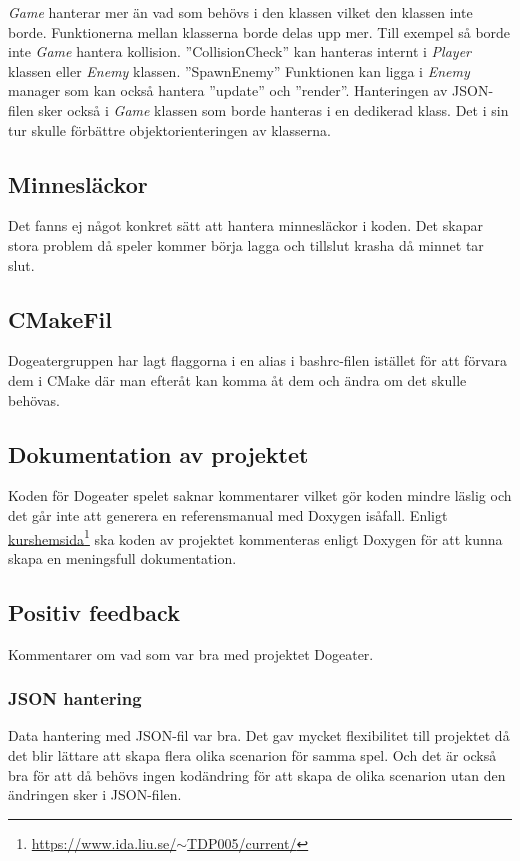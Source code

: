 \documentclass[12pt]{TDP005mall}
\begin{document}
\textit{Game} hanterar mer än vad som behövs i den klassen vilket den klassen inte borde. Funktionerna mellan klasserna borde delas upp mer. Till exempel så borde inte \textit{Game} hantera kollision. ''CollisionCheck'' kan hanteras internt i \textit{Player} klassen eller \textit{Enemy} klassen. 
''SpawnEnemy'' Funktionen kan ligga i \textit{Enemy} manager som kan också hantera ''update'' och ''render''.
Hanteringen av JSON-filen sker också i \textit{Game} klassen som borde hanteras i en dedikerad klass. Det i sin tur skulle förbättre objektorienteringen av klasserna.

\subsection{Minnesläckor}
Det fanns ej något konkret sätt att hantera minnesläckor i koden. Det skapar stora problem då speler kommer börja lagga och tillslut krasha då minnet tar slut.

\subsection{CMakeFil}
Dogeatergruppen har lagt flaggorna i en alias i bashrc-filen istället för att förvara dem i CMake där man efteråt kan komma åt dem och ändra om det skulle behövas. 



\subsection{Dokumentation av projektet}
Koden för Dogeater spelet saknar kommentarer vilket gör koden mindre läslig och det går inte att generera en referensmanual med Doxygen isåfall. 
Enligt \href{https://www.ida.liu.se/~TDP005/current/}{kurshemsida}\footnote{\href{https://www.ida.liu.se/~TDP005/current/}{https://www.ida.liu.se/\(\sim\)TDP005/current/}} ska koden av projektet kommenteras enligt Doxygen för att kunna skapa en meningsfull dokumentation.


\subsection{Positiv feedback}
Kommentarer om vad som var bra med projektet Dogeater.  

\subsubsection{JSON hantering}
Data hantering med JSON-fil var bra. Det gav mycket flexibilitet till projektet då det blir lättare att skapa flera olika scenarion för samma spel. Och det är också bra för att då behövs ingen kodändring för att skapa de olika scenarion utan den ändringen sker i JSON-filen.
\end{document}
